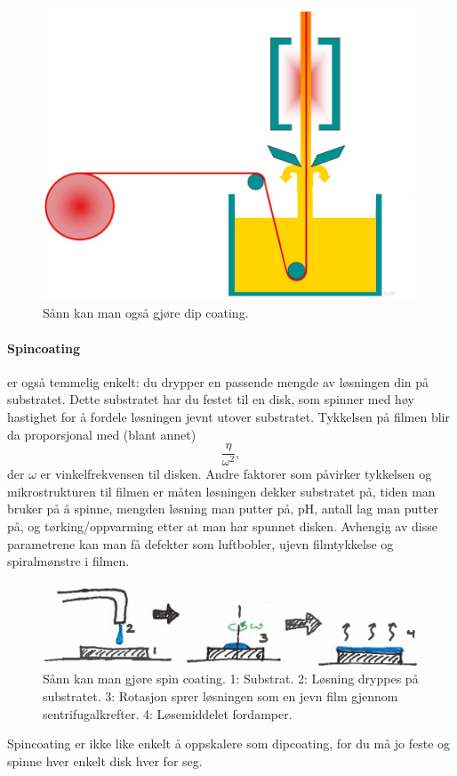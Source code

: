\begin{figure}[H]
	\bmd\centering
	\includegraphics[width=0.8\linewidth]{metodefigs/dipcoatcont.png}
	\caption{Sånn kan man også gjøre dip coating.}
\emd\end{figure}

\paragraph{Spincoating} er også temmelig enkelt: du drypper en passende mengde av løsningen din på substratet. Dette substratet har du festet til en disk, som spinner med høy hastighet for å fordele løsningen jevnt utover substratet. Tykkelsen på filmen blir da proporsjonal med (blant annet)
\begin{equation}
	\frac{\eta}{\omega^2},
\end{equation}
der $\omega$ er vinkelfrekvensen til disken. Andre faktorer som påvirker tykkelsen og mikrostrukturen til filmen er måten løsningen dekker substratet på, tiden man bruker på å spinne, mengden løsning man putter på, pH, antall lag man putter på, og tørking/oppvarming etter at man har spunnet disken. Avhengig av disse parametrene kan man få defekter som luftbobler, ujevn filmtykkelse og spiralmønstre i filmen.
\begin{figure}[H]
\bmd\centering
\includegraphics[width=\linewidth]{metodefigs/spincoat.png}
\caption{Sånn kan man gjøre spin coating. 1: Substrat. 2: Løsning dryppes på substratet. 3: Rotasjon sprer løsningen som en jevn film gjennom sentrifugalkrefter. 4: Løsemiddelet fordamper.}
\emd\end{figure}
Spincoating er ikke like enkelt å oppskalere som dipcoating, for du må jo feste og spinne hver enkelt disk hver for seg.

